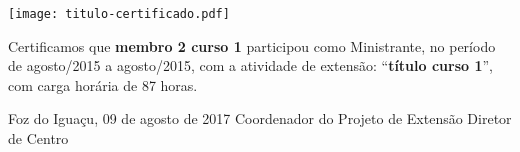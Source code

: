 \documentclass[a4paper,brazil]{article}%
\begin{document}
%
\normalsize%

\pagestyle{empty}
\BgThispage
%
\vspace*{2cm}%
\begin{flushright}%
\texttt{[image: titulo-certificado.pdf]}%
\linebreak%
\end{flushright}%
\vspace*{-1cm}%
\Large%
%


        Certificamos que \textbf{membro 2 curso 1} participou como Ministrante, no período de agosto/2015 a agosto/2015, com a atividade de extensão: ``\textbf{título curso 1}'', com carga horária de 87 horas.

\vspace*{1.5cm}%
\hspace*{7cm}%
\begin{minipage}{\widthof{Foz do Iguaçu, 09 de agosto de 2017}}%
\begin{center}%
Foz do Iguaçu, 09 de agosto de 2017%
\newline%
\newline%
\newline%
Coordenador do Projeto de Extensão%
\newline%
\newline%
\newline%
Diretor de Centro%
\end{center}%
\end{minipage}%
\end{document}
